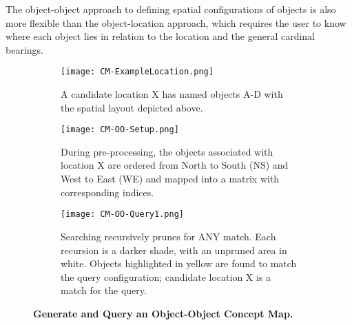 The object-object approach to defining spatial configurations of objects is also more flexible than the object-location approach, which requires the user to know where each object lies in relation to the location and the general cardinal bearings.



\begin{figure*}[h]
    \centering
    \begin{subfigure}[t]{.25\textwidth}
        \texttt{[image: CM-ExampleLocation.png]}
        \caption{\small A candidate location X has named objects A-D with the spatial layout depicted above.}
        \label{fig:CM-Example}
    \end{subfigure}
    \hfill
    \begin{subfigure}[t]{.25\textwidth}
        \texttt{[image: CM-OO-Setup.png]}
        \caption{\small During pre-processing, the objects associated with location X are ordered from North to South (NS) and West to East (WE) and mapped into a matrix with corresponding indices.}
        \label{fig:CM-OO-Setup}
    \end{subfigure}
    \hfill
        \begin{subfigure}[t]{.25\textwidth}
        \texttt{[image: CM-OO-Query1.png]}
        \caption{\small Searching recursively prunes for ANY match. Each recursion is a darker shade, with an unpruned area in white. Objects highlighted in yellow are found to match the query configuration; candidate location X is a match for the query.}
        \label{fig:CM-OO-Query}
    \hfill
    \end{subfigure}
    \caption{\textbf{Generate and Query an Object-Object Concept Map.}}\label{figure:ConceptMap} 
\end{figure*}

